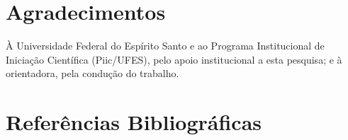 \documentclass[10pt,a4paper]{article}
\begin{document}
\section*{Agradecimentos}
À Universidade Federal do Espírito Santo e ao Programa Institucional de Iniciação Científica (Piic/UFES), pelo apoio institucional a esta pesquisa; e à orientadora, pela condução do trabalho.

\section*{Referências Bibliográficas}
\end{document}
